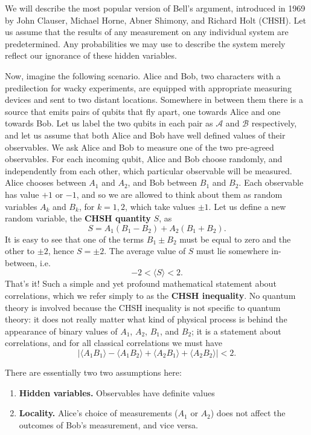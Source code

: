 \documentclass[fleqn]{article}
\providecommand{\tightlist}{%
  \setlength{\itemsep}{0pt}\setlength{\parskip}{0pt}}
\begin{document}
We will describe the most popular version of Bell's argument, introduced in 1969 by John Clauser, Michael Horne, Abner Shimony, and Richard Holt (CHSH).
Let us assume that the results of any measurement on any individual system are predetermined.
Any probabilities we may use to describe the system merely reflect our ignorance of these hidden variables.

Now, imagine the following scenario.
Alice and Bob, two characters with a predilection for wacky experiments, are equipped with appropriate measuring devices and sent to two distant locations.
Somewhere in between them there is a source that emits pairs of qubits that fly apart, one towards Alice and one towards Bob.
Let us label the two qubits in each pair as \(\mathcal{A}\) and \(\mathcal{B}\) respectively, and let us assume that both Alice and Bob have well defined values of their observables.
We ask Alice and Bob to measure one of the two pre-agreed observables.
For each incoming qubit, Alice and Bob choose randomly, and independently from each other, which particular observable will be measured.
Alice chooses between \(A_1\) and \(A_2\), and Bob between \(B_1\) and \(B_2\).
Each observable has value \(+1\) or \(-1\), and so we are allowed to think about them as random variables \(A_k\) and \(B_k\), for \(k=1,2\), which take values \(\pm 1\).
Let us define a new random variable, the \textbf{CHSH quantity} \(S\), as
\[
  S = A_1(B_1 - B_2) + A_2(B_1 + B_2).
\]
It is easy to see that one of the terms \(B_1\pm B_2\) must be equal to zero and the other to \(\pm 2\), hence \(S=\pm2\).
The average value of \(S\) must lie somewhere in-between, i.e.
\[
  -2 < \langle S\rangle < 2.
\]
That's it!
Such a simple and yet profound mathematical statement about correlations, which we refer simply to as the \textbf{CHSH inequality}.
No quantum theory is involved because the CHSH inequality is not specific to quantum theory: it does not really matter what kind of physical process is behind the appearance of binary values of \(A_1\), \(A_2\), \(B_1\), and \(B_2\); it is a statement about correlations, and for all classical correlations we must have
\[
  |
    \langle A_1 B_1\rangle - \langle A_1 B_2\rangle + \langle A_2 B_1\rangle + \langle A_2 B_2\rangle
  | < 2.
\]

There are essentially two two assumptions here:

\begin{enumerate}
\def\labelenumi{\arabic{enumi}.}
\tightlist
\item
  \textbf{Hidden variables.} Observables have definite values
\item
  \textbf{Locality.} Alice's choice of measurements (\(A_1\) or \(A_2\)) does not affect the outcomes of Bob's measurement, and vice versa.
\end{enumerate}
\end{document}
